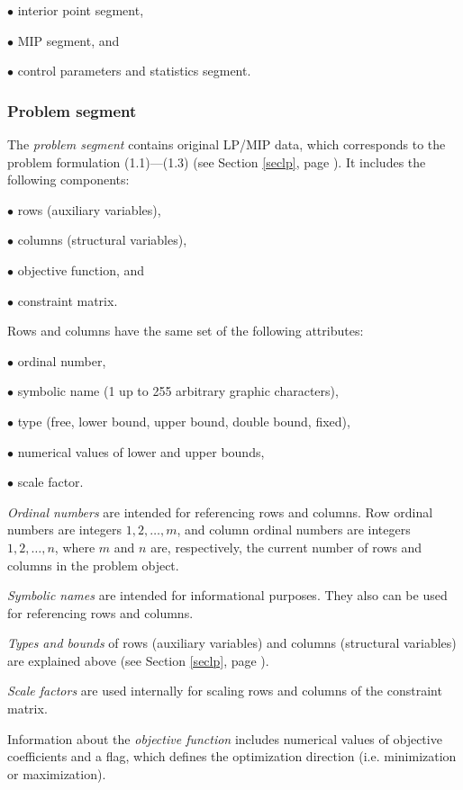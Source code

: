 $\bullet$ interior point segment,

$\bullet$ MIP segment, and

$\bullet$ control parameters and statistics segment.

\subsubsection*{Problem segment}

The {\it problem segment} contains original LP/MIP data, which
corresponds to the problem formulation (1.1)---(1.3) (see Section
\ref{seclp}, page \pageref{seclp}). It includes the following
components:

$\bullet$ rows (auxiliary variables),

$\bullet$ columns (structural variables),

$\bullet$ objective function, and

$\bullet$ constraint matrix.

Rows and columns have the same set of the following attributes:

$\bullet$ ordinal number,

$\bullet$ symbolic name (1 up to 255 arbitrary graphic characters),

$\bullet$ type (free, lower bound, upper bound, double bound, fixed),

$\bullet$ numerical values of lower and upper bounds,

$\bullet$ scale factor.

{\it Ordinal numbers} are intended for referencing rows and columns.
Row ordinal numbers are integers $1, 2, \dots, m$, and column ordinal
numbers are integers $1, 2, \dots, n$, where $m$ and $n$ are,
respectively, the current number of rows and columns in the problem
object.

{\it Symbolic names} are intended for informational purposes. They also
can be used for referencing rows and columns.

{\it Types and bounds} of rows (auxiliary variables) and columns
(structural variables) are explained above (see Section \ref{seclp},
page \pageref{seclp}).

{\it Scale factors} are used internally for scaling rows and columns of
the constraint matrix.

Information about the {\it objective function} includes numerical
values of objective coefficients and a flag, which defines the
optimization direction (i.e. minimization or maximization).

